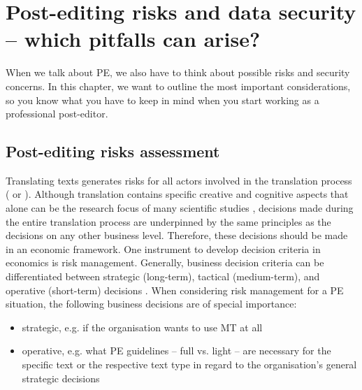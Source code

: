 \chapter{Post-editing risks and data security -- which pitfalls can arise?}\label{sec:7}




\vspace{\baselineskip}


When we talk about PE, we also have to think about possible risks and security concerns. In this chapter, we want to outline the most important considerations, so you know what you have to keep in mind when you start working as a professional post-editor.

\section{Post-editing risks assessment}\label{sec:7:1}

Translating texts generates risks for all actors involved in the translation process (\citealt{canfora2015risikomanagement} or \citealt{canfora2018ostriches}). Although translation contains specific creative and cognitive aspects that alone can be the research focus of many scientific studies \citep{pym2018risk}, decisions made during the entire translation process are underpinned by the same principles as the decisions on any other business level. Therefore, these decisions should be made in an economic framework. One instrument to develop decision criteria in economics is risk management. Generally, business decision criteria can be differentiated between strategic (long-term), tactical (medium-term), and operative (short-term) decisions \citep{hofmann2012prozessgestutztes}. When considering risk management for a PE situation, the following business decisions are of special importance: 

\begin{itemize}
    \item strategic, e.g. if the organisation wants to use MT at all 
    \item operative, e.g. what PE guidelines – full vs. light – are necessary for the specific text or the respective text type in regard to the organisation’s general strategic decisions
\end{itemize}

